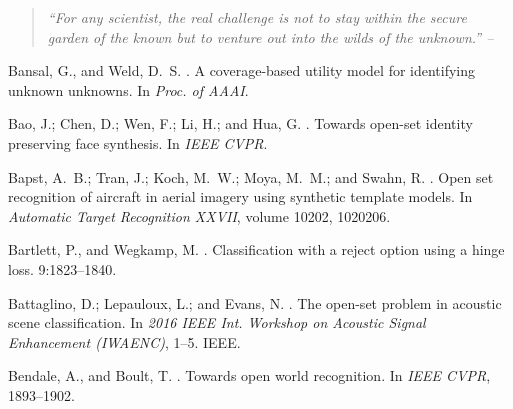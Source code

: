 \documentclass[letterpaper]{article}
\begin{document}
\begin{quote}
\em
``For any scientist, the real challenge is not to stay within the secure garden of the known but to venture out into the wilds of the unknown.” --
  \cite{du2017great}    
\end{quote}






\fontsize{9.5pt}{10.0pt} \selectfont
\fontsize{9.1pt}{10pt}\selectfont

%
%

\begin{thebibliography}{}

Bansal, G., and Weld, D.~S.
.
\newblock A coverage-based utility model for identifying unknown unknowns.
\newblock In {\em Proc. of AAAI}.

Bao, J.; Chen, D.; Wen, F.; Li, H.; and Hua, G.
.
\newblock Towards open-set identity preserving face synthesis.
\newblock In {\em IEEE CVPR}.

Bapst, A.~B.; Tran, J.; Koch, M.~W.; Moya, M.~M.; and Swahn, R.
.
\newblock Open set recognition of aircraft in aerial imagery using synthetic
  template models.
\newblock In {\em Automatic {Target} {Recognition} {XXVII}}, volume 10202,
  1020206.

Bartlett, P., and Wegkamp, M.
.
\newblock Classification with a reject option using a hinge loss.
 9:1823--1840.

Battaglino, D.; Lepauloux, L.; and Evans, N.
.
\newblock The open-set problem in acoustic scene classification.
\newblock In {\em 2016 {IEEE} {Int.} {Workshop} on {Acoustic} {Signal}
  {Enhancement} ({IWAENC})},  1--5.
\newblock IEEE.

Bendale, A., and Boult, T.
.
\newblock Towards open world recognition.
\newblock In {\em IEEE CVPR},  1893--1902.


\end{thebibliography}
\end{document}
